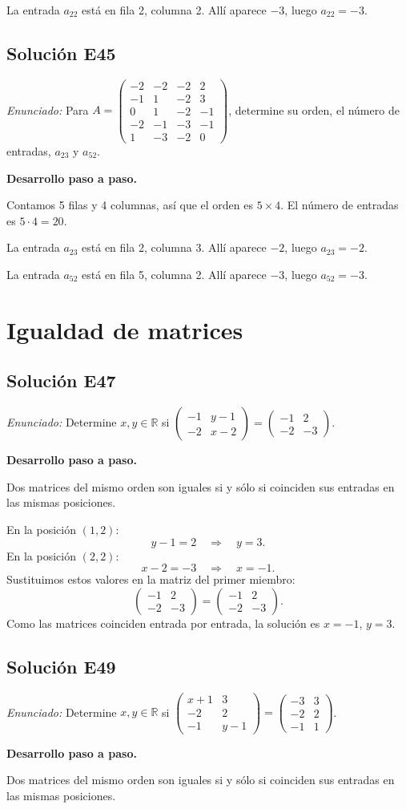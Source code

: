 \documentclass[12pt]{article}
\theoremstyle{remark}
\newcommand{\solucion}[2]{\Needspace{11\baselineskip}\subsection*{Solución E#1}\noindent\textit{Enunciado:} #2\par\medskip\noindent\textbf{Desarrollo paso a paso.}\par\medskip}
\begin{document}
La entrada $a_{22}$ está en fila 2, columna 2. Allí aparece $-3$, luego $\boxed{a_{22}=-3}$.


\medskip

\solucion{45}{Para $A=\begin{pmatrix}-2&-2&-2&2\\-1&1&-2&3\\0&1&-2&-1\\-2&-1&-3&-1\\1&-3&-2&0\end{pmatrix}$, determine su orden, el número de entradas, $a_{23}$ y $a_{52}$.}
Contamos 5 filas y 4 columnas, así que el orden es $5\times4$. El número de entradas es $5\cdot 4=20$.

La entrada $a_{23}$ está en fila 2, columna 3. Allí aparece $-2$, luego $\boxed{a_{23}=-2}$.

La entrada $a_{52}$ está en fila 5, columna 2. Allí aparece $-3$, luego $\boxed{a_{52}=-3}$.


\medskip

\section{Igualdad de matrices}

\solucion{47}{Determine $x,y\in\mathbb R$ si $\begin{pmatrix}-1&y - 1\\-2&x - 2\end{pmatrix}=\begin{pmatrix}-1&2\\-2&-3\end{pmatrix}$.}
Dos matrices del mismo orden son iguales si y sólo si coinciden sus entradas en las mismas posiciones.

En la posición $(1,2)$:
\[
y - 1=2\quad\Longrightarrow\quad y=3.
\]
En la posición $(2,2)$:
\[
x - 2=-3\quad\Longrightarrow\quad x=-1.
\]
Sustituimos estos valores en la matriz del primer miembro:
\[
\begin{pmatrix}-1&2\\-2&-3\end{pmatrix}=\begin{pmatrix}-1&2\\-2&-3\end{pmatrix}.
\]
Como las matrices coinciden entrada por entrada, la solución es $x=-1$, $y=3$.


\medskip

\solucion{49}{Determine $x,y\in\mathbb R$ si $\begin{pmatrix}x + 1&3\\-2&2\\-1&y - 1\end{pmatrix}=\begin{pmatrix}-3&3\\-2&2\\-1&1\end{pmatrix}$.}
Dos matrices del mismo orden son iguales si y sólo si coinciden sus entradas en las mismas posiciones.
\end{document}
